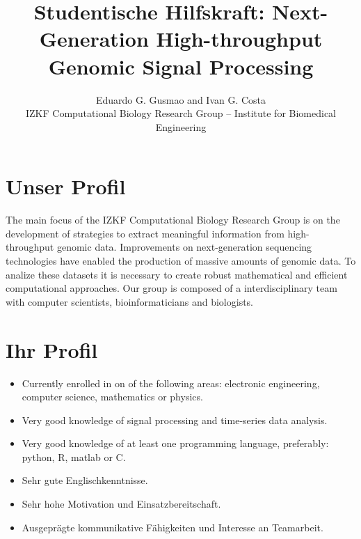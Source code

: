 \documentclass[11pt]{article}
\begin{document}
\title{Studentische Hilfskraft: Next-Generation High-throughput Genomic Signal Processing} \date{}

\author{Eduardo G. Gusmao and Ivan G. Costa\\
IZKF Computational Biology Research Group -- Institute for Biomedical Engineering
}

\thispagestyle{empty}

\maketitle

\setlength{\parskip}{0.5cm}

\section{Unser Profil}
\label{sec:unserprofil}

The main focus of the IZKF Computational Biology Research Group is on the development of strategies to extract meaningful information from high-throughput genomic data. Improvements on next-generation sequencing technologies have enabled the production of massive amounts of genomic data. To analize these datasets it is necessary to create robust mathematical and efficient computational approaches. Our group is composed of a interdisciplinary team with computer scientists, bioinformaticians and biologists. 

\section{Ihr Profil}
\label{sec:ihrprofil}

\begin{itemize}
  \item Currently enrolled in on of the following areas: electronic engineering, computer science, mathematics or physics.
  \item Very good knowledge of signal processing and time-series data analysis.
  \item Very good knowledge of at least one programming language, preferably: python, R, matlab or C.
  \item Sehr gute Englischkenntnisse.
  \item Sehr hohe Motivation und Einsatzbereitschaft.
  \item Ausgepr{\"a}gte kommunikative F{\"a}higkeiten und Interesse an Teamarbeit.
\end{itemize}
\end{document}

